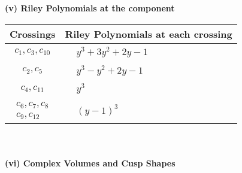 \documentclass[1p]{elsarticle_modified}
\theoremstyle{definition}
\begin{document}
\flushleft \textbf{(v) Riley Polynomials at the component}\newline \\
\begin{tabular}{m{50pt}|m{274pt}}
Crossings & \hspace{64pt}Riley Polynomials at each crossing \\
\hline $$\begin{aligned}c_{1},c_{3},c_{10}\end{aligned}$$&$\begin{aligned}
&y^3+3 y^2+2 y-1
\end{aligned}$\\
\hline $$\begin{aligned}c_{2},c_{5}\end{aligned}$$&$\begin{aligned}
&y^3- y^2+2 y-1
\end{aligned}$\\
\hline $$\begin{aligned}c_{4},c_{11}\end{aligned}$$&$\begin{aligned}
&y^3
\end{aligned}$\\
\hline $$\begin{aligned}c_{6},c_{7},c_{8}\\c_{9},c_{12}\end{aligned}$$&$\begin{aligned}
&(y-1)^3
\end{aligned}$\\
\hline
\end{tabular}\\~\\
\newpage\flushleft \textbf{(vi) Complex Volumes and Cusp Shapes}
\end{document}

